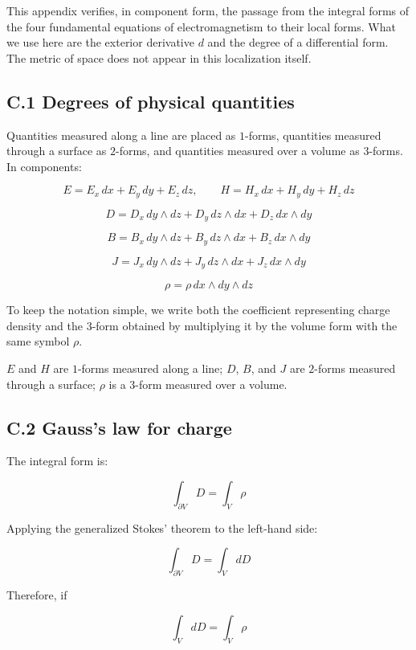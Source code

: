 \documentclass[a4paper,12pt,openany]{book}
\begin{document}
This appendix verifies, in component form, the passage from the integral
forms of the four fundamental equations of electromagnetism to their
local forms. What we use here are the exterior derivative \(d\) and the
degree of a differential form. The metric of space does not appear in
this localization itself.

\hypertarget{c.1-degrees-of-physical-quantities}{%
\subsection*{C.1 Degrees of physical
quantities}\label{c.1-degrees-of-physical-quantities}}

Quantities measured along a line are placed as \(1\)-forms, quantities
measured through a surface as \(2\)-forms, and quantities measured over
a volume as \(3\)-forms. In components:

\[
E = E_x\,dx+E_y\,dy+E_z\,dz,
\qquad
H = H_x\,dx+H_y\,dy+H_z\,dz
\]

\[D = D_x\,dy\wedge dz + D_y\,dz\wedge dx + D_z\,dx\wedge dy\]

\[B = B_x\,dy\wedge dz + B_y\,dz\wedge dx + B_z\,dx\wedge dy\]

\[J = J_x\,dy\wedge dz + J_y\,dz\wedge dx + J_z\,dx\wedge dy\]

\[
\rho = \rho\,dx\wedge dy\wedge dz
\]

To keep the notation simple, we write both the coefficient representing
charge density and the \(3\)-form obtained by multiplying it by the
volume form with the same symbol \(\rho\).

\(E\) and \(H\) are \(1\)-forms measured along a line; \(D\), \(B\), and
\(J\) are \(2\)-forms measured through a surface; \(\rho\) is a
\(3\)-form measured over a volume.

\hypertarget{c.2-gausss-law-for-charge}{%
\subsection*{C.2 Gauss's law for
charge}\label{c.2-gausss-law-for-charge}}

The integral form is:

\[
\int_{\partial V}D=\int_V\rho
\]

Applying the generalized Stokes' theorem to the left-hand side:

\[
\int_{\partial V}D=\int_V dD
\]

Therefore, if

\[
\int_V dD=\int_V\rho
\]
\end{document}
